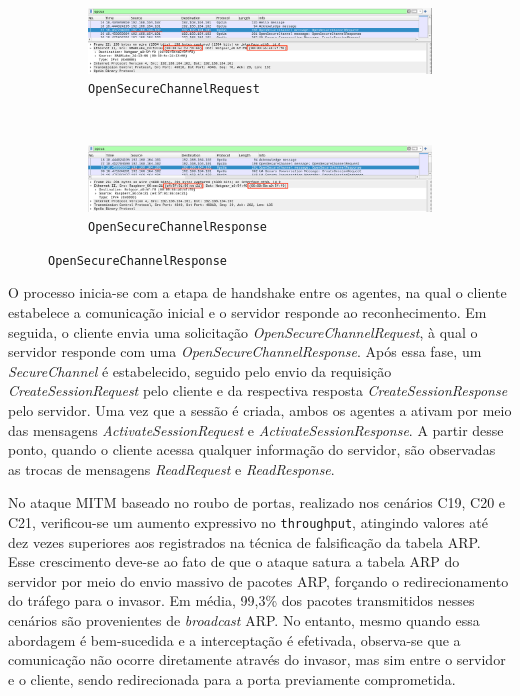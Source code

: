         \begin{figure}[htbp!]
            \centering
            \caption{\label{fig:0-mitm-wireshark}Interceptação de pacotes no ataque MITM com modo de segurança `None'}
            \begin{subfigure}[t]{1\textwidth}
                \centering
                \caption{\texttt{OpenSecureChannelRequest}}
                \includegraphics[width=1\textwidth]{USPSC-img/0-mitm-arp_1.png}
            \end{subfigure}%
            \\
            \begin{subfigure}[t]{1\textwidth}
                \centering
                \caption{\texttt{OpenSecureChannelResponse}}
                \includegraphics[width=1\textwidth]{USPSC-img/0-mitm-arp_2.png}
            \end{subfigure}%
        \end{figure}

        O processo inicia-se com a etapa de handshake entre os agentes, na qual o cliente estabelece a comunicação inicial e o servidor responde ao reconhecimento. Em seguida, o cliente envia uma solicitação \textit{OpenSecureChannelRequest}, à qual o servidor responde com uma \textit{OpenSecureChannelResponse}. Após essa fase, um \textit{SecureChannel} é estabelecido, seguido pelo envio da requisição \textit{CreateSessionRequest} pelo cliente e da respectiva resposta \textit{CreateSessionResponse} pelo servidor. Uma vez que a sessão é criada, ambos os agentes a ativam por meio das mensagens \textit{ActivateSessionRequest} e \textit{ActivateSessionResponse}. A partir desse ponto, quando o cliente acessa qualquer informação do servidor, são observadas as trocas de mensagens \textit{ReadRequest} e \textit{ReadResponse}.

        No ataque MITM baseado no roubo de portas, realizado nos cenários C19, C20 e C21, verificou-se um aumento expressivo no \texttt{throughput}, atingindo valores até dez vezes superiores aos registrados na técnica de falsificação da tabela ARP. Esse crescimento deve-se ao fato de que o ataque satura a tabela ARP do servidor por meio do envio massivo de pacotes ARP, forçando o redirecionamento do tráfego para o invasor. Em média, 99,3\% dos pacotes transmitidos nesses cenários são provenientes de \textit{broadcast} ARP. No entanto, mesmo quando essa abordagem é bem-sucedida e a interceptação é efetivada, observa-se que a comunicação não ocorre diretamente através do invasor, mas sim entre o servidor e o cliente, sendo redirecionada para a porta previamente comprometida.

